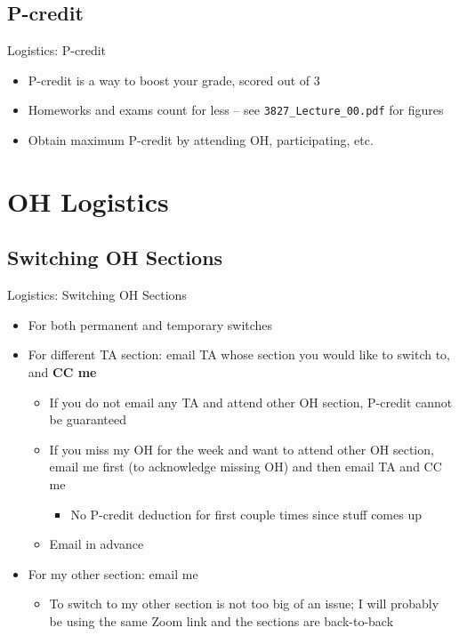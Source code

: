 \documentclass{../slides}
\begin{document}
\subsection{P-credit}
\begin{frame}{Logistics: P-credit}
    \begin{itemize}
        \item P-credit is a way to boost your grade, scored out of $3$
        \item Homeworks and exams count for less -- see \lstinline{3827_Lecture_00.pdf} for figures
        \item Obtain maximum P-credit by attending OH, participating, etc.
    \end{itemize}
\end{frame}

\section{OH Logistics}
\subsection{Switching OH Sections}
\begin{frame}{Logistics: Switching OH Sections}
    \begin{itemize}
        \item For both permanent and temporary switches
        \item For different TA section: email TA whose section you would like to switch to, and \textbf{CC me}
        \begin{itemize}
            \item If you do not email any TA and attend other OH section, P-credit cannot be guaranteed
            \item If you miss my OH for the week and want to attend other OH section, email me first (to acknowledge missing OH) and then email TA and CC me
            \begin{itemize}
                \item No P-credit deduction for first couple times since stuff comes up
            \end{itemize}
            \item Email in advance
        \end{itemize}
        \item For my other section: email me
        \begin{itemize}
            \item To switch to my other section is not too big of an issue; I will probably be using the same Zoom link and the sections are back-to-back
        \end{itemize}
    \end{itemize}
\end{frame}
\end{document}
